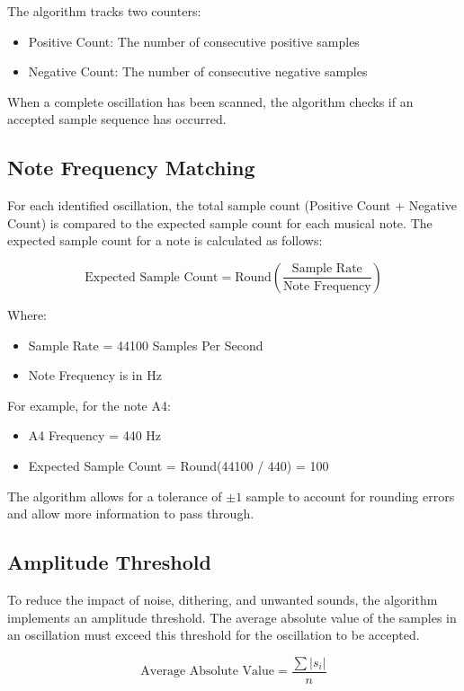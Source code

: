 \documentclass[12pt,a4paper]{article}
\begin{document}
The algorithm tracks two counters:
\begin{itemize}
    \item Positive Count: The number of consecutive positive samples
    \item Negative Count: The number of consecutive negative samples
\end{itemize}

When a complete oscillation has been scanned, the algorithm checks if an accepted sample sequence has occurred.

\subsection{Note Frequency Matching}
For each identified oscillation, the total sample count (Positive Count + Negative Count) is compared to the expected sample count for each musical note. The expected sample count for a note is calculated as follows:

\begin{equation*}
    \text{Expected Sample Count} = \text{Round}(\frac{\text{Sample Rate}}{\text{Note Frequency}})
\end{equation*}

Where:
\begin{itemize}
    \item Sample Rate = 44100 Samples Per Second
    \item Note Frequency is in Hz
\end{itemize}

For example, for the note A4:
\begin{itemize}
    \item A4 Frequency = 440 Hz
    \item Expected Sample Count = Round(44100 / 440) = 100
\end{itemize}

The algorithm allows for a tolerance of $\pm1$ sample to account for rounding errors and allow more information to pass through.

\subsection{Amplitude Threshold}
To reduce the impact of noise, dithering, and unwanted sounds, the algorithm implements an amplitude threshold. The average absolute value of the samples in an oscillation must exceed this threshold for the oscillation to be accepted.

\begin{equation*}
    \text{Average Absolute Value} = \frac{\sum|s_i|}{n}
\end{equation*}
{\centering
\small{}
\par}
\end{document}
